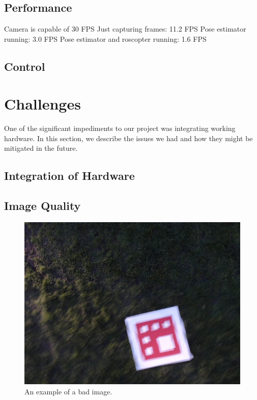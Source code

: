 \documentclass[10pt]{scrartcl} %
\begin{document}
\subsection{Performance}

Camera is capable of 30 FPS
Just capturing frames: 11.2 FPS
Pose estimator running: 3.0 FPS
Pose estimator and roscopter running: 1.6 FPS


\subsection{Control}

\section{Challenges}
One of the significant impediments to our project was integrating working hardware. In this section, we describe the issues we had and how they might be mitigated in the future.

\subsection{Integration of Hardware}

\subsection{Image Quality}

\begin{figure}[h]
    \centering
    \includegraphics[width=\textwidth]{images/badimage.jpg}
    \caption{An example of a bad image.}
    \label{fig:badimage}
\end{figure}
\end{document}

